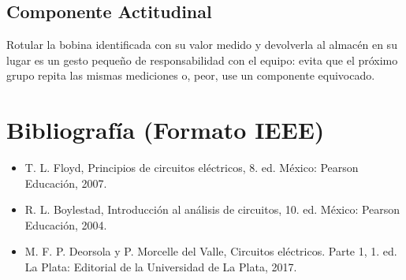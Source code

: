 \documentclass[11pt,letterpaper]{article}
\begin{document}
\subsection*{Componente Actitudinal}

\begin{cita}
Rotular la bobina identificada con su valor medido y devolverla al almacén en su lugar es un gesto pequeño de responsabilidad con el equipo: evita que el próximo grupo repita las mismas mediciones o, peor, use un componente equivocado.
\end{cita}

\section{Bibliografía (Formato IEEE)}

{\sloppy
\begin{itemize}[leftmargin=2.6em, labelwidth=2.2em, labelsep=0.4em, align=left]
  \item[{[1]}] T. L. Floyd, Principios de circuitos eléctricos, 8.\textordfeminine{} ed. México: Pearson Educación, 2007.
  \item[{[2]}] R. L. Boylestad, Introducción al análisis de circuitos, 10.\textordfeminine{} ed. México: Pearson Educación, 2004.
  \item[{[3]}] M. F. P. Deorsola y P. Morcelle del Valle, Circuitos eléctricos. Parte 1, 1.\textordfeminine{} ed. La Plata: Editorial de la Universidad de La Plata, 2017.
\end{itemize}
}
\end{document}
